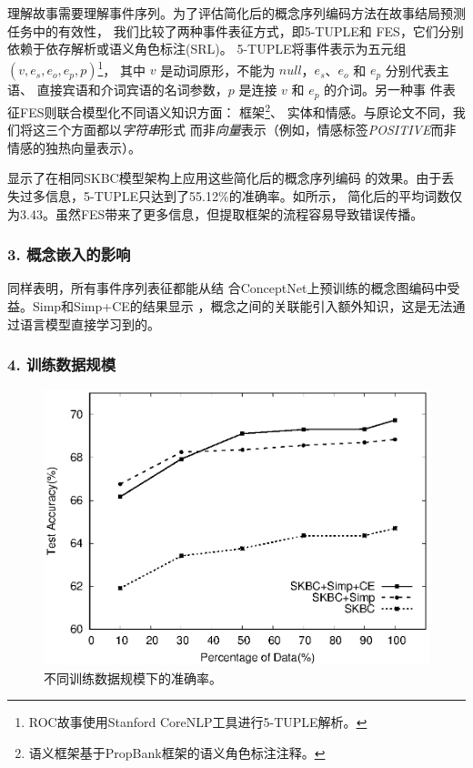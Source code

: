 理解故事需要理解事件序列。为了评估简化后的概念序列编码方法在故事结局预测任务中的有效性，
我们比较了两种事件表征方式，即5-TUPLE\cite{pichotta2016learning}和
FES\cite{peng2017joint}，它们分别依赖于依存解析或语义角色标注(SRL)。
5-TUPLE将事件表示为五元组 $(v, e_s, e_o, e_p, p)$\footnote{ROC故事使用Stanford CoreNLP工具进行5-TUPLE解析。}，
其中 $v$ 是动词原形，不能为 $null$，$e_s$、$e_o$ 和 $e_p$ 分别代表主语、
直接宾语和介词宾语的名词参数，$p$ 是连接 $v$ 和 $e_p$ 的介词。另一种事
件表征FES则联合模型化不同语义知识方面：
框架\footnote{语义框架基于PropBank框架的语义角色标注注释。}、
实体和情感。与原论文不同，我们将这三个方面都以\textit{字符串}形式
而非\textit{向量}表示（例如，情感标签\textit{POSITIVE}而非情感的独热向量表示）。

 显示了在相同SKBC模型架构上应用这些简化后的概念序列编码
的效果。由于丢失过多信息，5-TUPLE只达到了55.12\%的准确率。如所示，
简化后的平均词数仅为3.43。虽然FES带来了更多信息，但提取框架的流程容易导致错误传播。

\subsubsection*{3. 概念嵌入的影响}
\label{sec2:ce}
 同样表明，所有事件序列表征都能从结
合ConceptNet上预训练的概念图编码中受益。Simp和Simp+CE的结果显示
，概念之间的关联能引入额外知识，这是无法通过语言模型直接学习到的。

\subsubsection*{4. 训练数据规模}
\label{sec2:datasize}

\begin{figure}
\centering\includegraphics[width=0.8\columnwidth]{figures/story/trend}
\caption{不同训练数据规模下的准确率。}\label{fig2:trend}
\end{figure}

